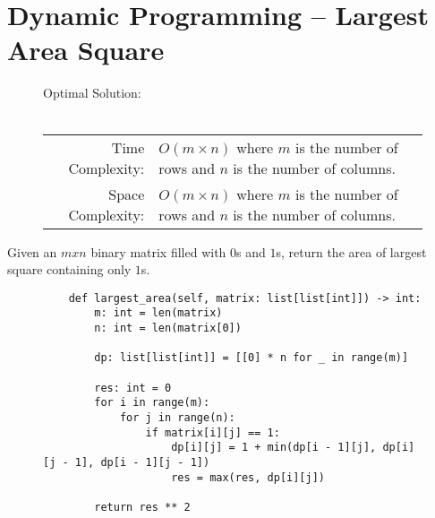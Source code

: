 
\section{Dynamic Programming -- Largest Area Square}

\begin{figure}[H]
    Optimal Solution:\\\\
    \begin{tabular}{rl}
        Time Complexity:& \(O(m \times n)\) where \(m\) is the number of rows
        and \(n\) is the number of columns.\\
        Space Complexity:& \(O(m \times n)\) where \(m\) is the number of rows
        and \(n\) is the number of columns.
    \end{tabular}
\end{figure}

Given an \(m x n\) binary matrix filled with \(0\)s and \(1\)s, return the area
of largest square containing only \(1\)s.

\begin{figure}[H]
    \centering
    \begin{verbatim}
    def largest_area(self, matrix: list[list[int]]) -> int:
        m: int = len(matrix)
        n: int = len(matrix[0])

        dp: list[list[int]] = [[0] * n for _ in range(m)]

        res: int = 0
        for i in range(m):
            for j in range(n):
                if matrix[i][j] == 1:
                    dp[i][j] = 1 + min(dp[i - 1][j], dp[i][j - 1], dp[i - 1][j - 1])
                    res = max(res, dp[i][j])

        return res ** 2
    \end{verbatim}
\end{figure}
